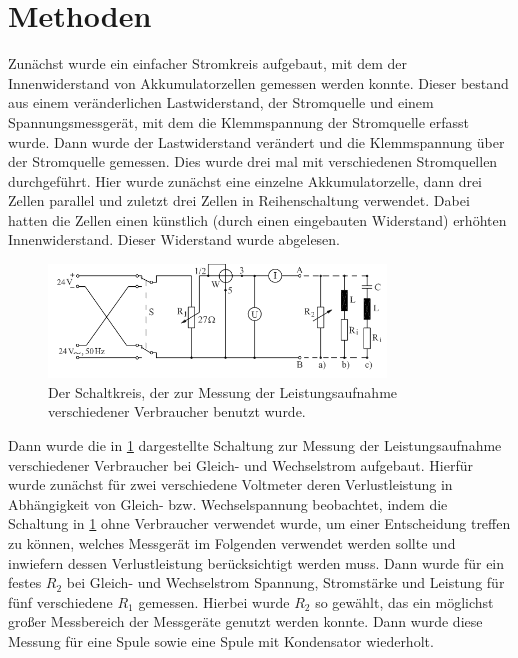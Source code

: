 \documentclass[
	a4paper,
	12pt,
	pagesize,
	ngerman
]{scrartcl}
\begin{document}
	
	\section{Methoden}
	Zunächst wurde ein einfacher Stromkreis aufgebaut, mit dem der Innenwiderstand von Akkumulatorzellen gemessen werden konnte.
	Dieser bestand aus einem veränderlichen Lastwiderstand, der Stromquelle und einem Spannungsmessgerät, mit dem die Klemmspannung der Stromquelle erfasst wurde.
	Dann wurde der Lastwiderstand verändert und die Klemmspannung über der Stromquelle gemessen.
	Dies wurde drei mal mit verschiedenen Stromquellen durchgeführt.
	Hier wurde zunächst eine einzelne Akkumulatorzelle, dann drei Zellen parallel und zuletzt drei Zellen in Reihenschaltung verwendet.
	Dabei hatten die Zellen einen künstlich (durch einen eingebauten Widerstand) erhöhten Innenwiderstand.
	Dieser Widerstand wurde abgelesen.
	\par
	
	\begin{figure}[tb]
		\includegraphics[width=0.8\textwidth]{Schaltkreis2}
		\centering
		\caption{Der Schaltkreis, der zur Messung der Leistungsaufnahme verschiedener Verbraucher benutzt wurde.}
		\label{SK2}
		\centering
	\end{figure}
	
	Dann wurde die in \cref{SK2} dargestellte Schaltung zur Messung der Leistungsaufnahme verschiedener Verbraucher bei Gleich- und Wechselstrom aufgebaut.
	Hierfür wurde zunächst für zwei verschiedene Voltmeter deren Verlustleistung in Abhängigkeit von Gleich- bzw. Wechselspannung beobachtet, indem die Schaltung in \cref{SK2} ohne Verbraucher verwendet wurde, um einer Entscheidung treffen zu können, welches Messgerät im Folgenden verwendet werden sollte und inwiefern dessen Verlustleistung berücksichtigt werden muss.
	Dann wurde für ein festes $ R_2 $ bei Gleich- und Wechselstrom Spannung, Stromstärke und Leistung für fünf verschiedene $ R_1 $ gemessen.
	Hierbei wurde $ R_2 $ so gewählt, das ein möglichst großer Messbereich der Messgeräte genutzt werden konnte.
	Dann wurde diese Messung für eine Spule sowie eine Spule mit Kondensator wiederholt. 
	
\end{document}
